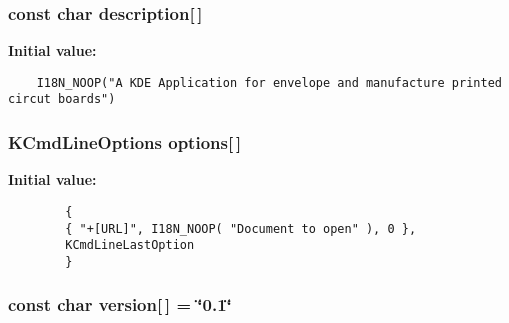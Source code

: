 \subsubsection{\setlength{\rightskip}{0pt plus 5cm}const char {\bf description}[$\,$]\hspace{0.3cm}{\tt  [static]}}\label{src_2main_8cpp_3a610225c9a1967ff50a2803b128c390}


{\bf Initial value:}

\footnotesize\begin{verbatim}
    I18N_NOOP("A KDE Application for envelope and manufacture printed circut boards")
\end{verbatim}\normalsize 
{}
\subsubsection{\setlength{\rightskip}{0pt plus 5cm}KCmd\-Line\-Options {\bf options}[$\,$]\hspace{0.3cm}{\tt  [static]}}\label{src_2main_8cpp_a044c05d2a52143e85765579e6fc52d8}


{\bf Initial value:}

\footnotesize\begin{verbatim}
        {
        { "+[URL]", I18N_NOOP( "Document to open" ), 0 },
        KCmdLineLastOption
        }
\end{verbatim}\normalsize 
{}
\subsubsection{\setlength{\rightskip}{0pt plus 5cm}const char {\bf version}[$\,$] = \char`\"{}0.1\char`\"{}\hspace{0.3cm}{\tt  [static]}}\label{src_2main_8cpp_17c47d085f10696b822db89fa67bda1d}



